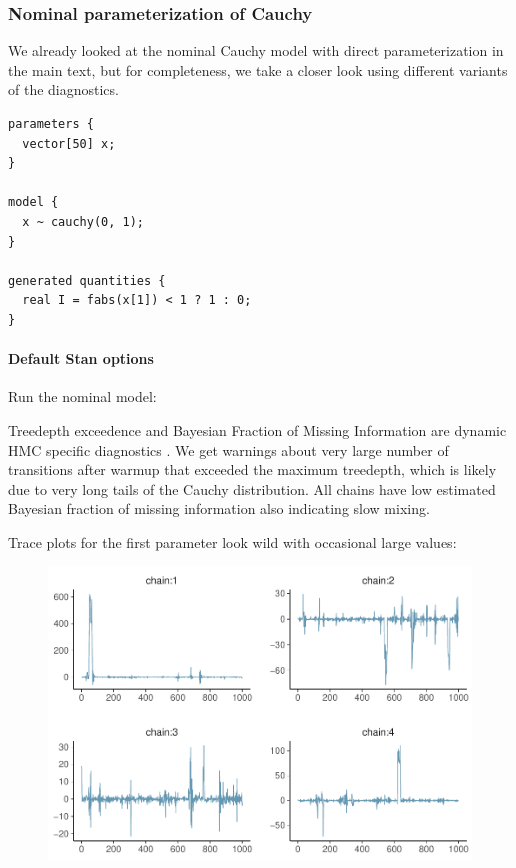 \documentclass[american,]{article}
\let\oldparagraph\paragraph
\renewcommand{\paragraph}[1]{\oldparagraph{#1}\mbox{}}
\begin{document}
\hypertarget{nominal-parameterization-of-cauchy-1}{%
\subsubsection*{Nominal parameterization of
Cauchy}\label{nominal-parameterization-of-cauchy-1}}

We already looked at the nominal Cauchy model with direct
parameterization in the main text, but for completeness, we take a
closer look using different variants of the diagnostics.

\begin{verbatim}
parameters {
  vector[50] x;
}

model {
  x ~ cauchy(0, 1);
}

generated quantities {
  real I = fabs(x[1]) < 1 ? 1 : 0;
}
\end{verbatim}

\hypertarget{default-stan-options-1}{%
\paragraph{Default Stan options}\label{default-stan-options-1}}

Run the nominal model:

Treedepth exceedence and Bayesian Fraction of Missing Information are
dynamic HMC specific diagnostics \citep{betancourt2017conceptual}. We
get warnings about very large number of transitions after warmup that
exceeded the maximum treedepth, which is likely due to very long tails
of the Cauchy distribution. All chains have low estimated Bayesian
fraction of missing information also indicating slow mixing.

Trace plots for the first parameter look wild with occasional large
values:

\begin{figure}[t]
  \centering
  \includegraphics[width=0.6\linewidth]{graphics/trace-fit-nom-1.pdf}
\end{figure}
\end{document}
